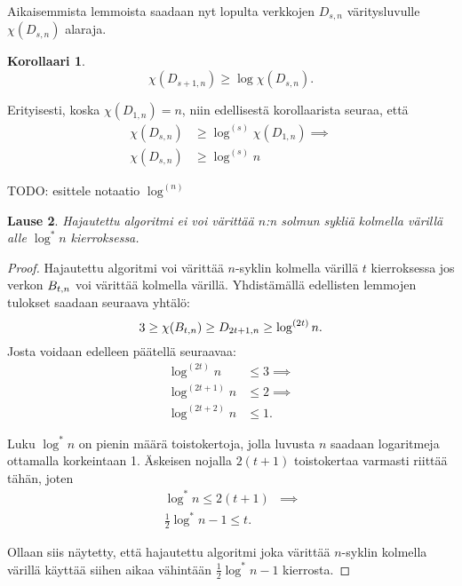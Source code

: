 \documentclass[finnish]{tktltiki2}
\newtheorem{lau}{Lause}
\newtheorem{kor}[lau]{Korollaari}
\theoremstyle{definition}
\theoremstyle{remark}
\newcommand{\Dsn}{D_{s,n}}
\newcommand{\Dssn}{D_{s+1,n}}
\begin{document}
Aikaisemmista lemmoista saadaan nyt lopulta verkkojen $\Dsn$ väritysluvulle
$\chi(\Dsn)$ alaraja.

\begin{kor}
    \begin{equation*}
        \chi(\Dssn) \geq \log \chi(\Dsn).
    \end{equation*}
\end{kor}

Erityisesti, koska $\chi(D_{1,n}) = n$, niin edellisestä korollaarista seuraa, että
%
\begin{align*}
    \chi(\Dsn) &\geq \log^{(s)} \chi(D_{1,n}) \implies \\
    \chi(\Dsn) &\geq \log^{(s)} n
\end{align*}

TODO: esittele notaatio $\log^{(n)}$

\begin{lau}
    Hajautettu algoritmi ei voi värittää $n$:n solmun sykliä kolmella värillä
    alle $\log^* n$ kierroksessa.
\end{lau}

\begin{proof}
    Hajautettu algoritmi voi värittää $n$-syklin kolmella värillä $t$
    kierroksessa jos verkon $B_{t,n}$ voi värittää kolmella värillä. Yhdistämällä
    edellisten lemmojen tulokset saadaan seuraava yhtälö:
    \begin{equation*}
        3 \geq \chi(B_{t,n}) \geq D_{2t+1, n} \geq \log^{(2t)} n.
    \end{equation*}
    Josta voidaan edelleen päätellä seuraavaa:
    \begin{align*}
        \log^{(2t)}   n &\leq 3 \implies \\
        \log^{(2t+1)} n &\leq 2 \implies \\
        \log^{(2t+2)} n &\leq 1.
    \end{align*}

    Luku $\log^* n$ on pienin määrä toistokertoja, jolla luvusta $n$ saadaan
    logaritmeja ottamalla korkeintaan 1. Äskeisen nojalla $2(t+1)$ toistokertaa
    varmasti riittää tähän, joten
    \begin{align*}
        \log^* n \leq 2(t+1)            & \implies \\
        \frac{1}{2} \log^* n - 1 \leq t. &
    \end{align*}

    Ollaan siis näytetty, että hajautettu algoritmi joka värittää $n$-syklin
    kolmella värillä käyttää siihen aikaa vähintään $\frac{1}{2} \log^* n - 1$
    kierrosta.

\end{proof}


%
%
% 
%



\end{document}
